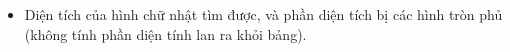 \begin{itemize}
	\item 

       Diện tích của hình chữ nhật tìm được, và phần diện tích bị các hình tròn phủ (không tính phần diện tính lan ra khỏi bảng).      



\end{itemize}